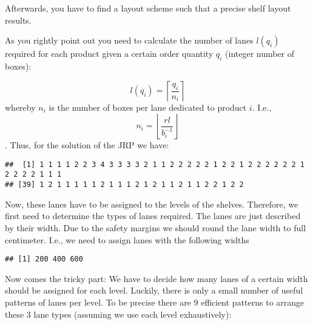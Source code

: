 \documentclass[
]{article}
\newenvironment{Shaded}{\begin{snugshade}}{\end{snugshade}}
\newcommand{\DecValTok}[1]{\textcolor[rgb]{0.00,0.00,0.81}{#1}}
\newcommand{\KeywordTok}[1]{\textcolor[rgb]{0.13,0.29,0.53}{\textbf{#1}}}
\newcommand{\NormalTok}[1]{#1}
\newcommand{\OperatorTok}[1]{\textcolor[rgb]{0.81,0.36,0.00}{\textbf{#1}}}
\newcommand{\StringTok}[1]{\textcolor[rgb]{0.31,0.60,0.02}{#1}}
\begin{document}
Afterwards, you have to find a layout scheme such that a precise shelf
layout results.

As you rightly point out you need to calculate the number of lanes
\(l(q_i)\) required for each product given a certain order quantity
\(q_i\) (integer number of boxes):

\[l(q_i) =\left\lceil \frac{q_i}{n_i} \right\rceil\] whereby \(n_i\) is
the number of boxes per lane dedicated to product \(i\). I.e.,
\[n_i = \left\lfloor \frac{rl}{b_i^{-1}} \right\rfloor\]. Thus, for the
solution of the JRP we have:

\begin{Shaded}
\end{Shaded}

\begin{verbatim}
##  [1] 1 1 1 1 2 2 3 4 3 3 3 3 2 1 1 2 2 2 2 2 1 2 2 1 2 2 2 2 2 2 1 2 2 2 2 1 1 1
## [39] 1 2 1 1 1 1 1 2 1 1 1 2 1 2 1 1 2 1 1 2 2 1 2 2
\end{verbatim}

Now, these lanes have to be assigned to the levels of the shelves.
Therefore, we first need to determine the types of lanes required. The
lanes are just described by their width. Due to the safety margins we
should round the lane width to full centimeter. I.e., we need to assign
lanes with the following widths

\begin{Shaded}
\end{Shaded}

\begin{verbatim}
## [1] 200 400 600
\end{verbatim}

Now comes the tricky part: We have to decide how many lanes of a certain
width should be assigned for each level. Luckily, there is only a small
number of useful patterns of lanes per level. To be precise there are 9
efficient patterns to arrange these 3 lane types (assuming we use each
level exhaustively):
\end{document}
